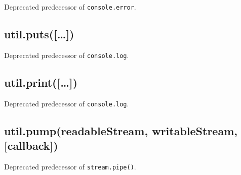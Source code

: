 Deprecated predecessor of \texttt{console.error}.

\subsection{util.puts({[}\ldots{}{]})}\label{util.puts}

\begin{Shaded}
\begin{Highlighting}[]
 \NormalTok{() }
\end{Highlighting}
\end{Shaded}

Deprecated predecessor of \texttt{console.log}.

\subsection{util.print({[}\ldots{}{]})}\label{util.print}

\begin{Shaded}
\begin{Highlighting}[]
 
\end{Highlighting}
\end{Shaded}

Deprecated predecessor of \texttt{console.log}.

\subsection{util.pump(readableStream, writableStream,
{[}callback{]})}\label{util.pumpreadablestream-writablestream-callback}

\begin{Shaded}
\begin{Highlighting}[]
 
\end{Highlighting}
\end{Shaded}

Deprecated predecessor of \texttt{stream.pipe()}.
